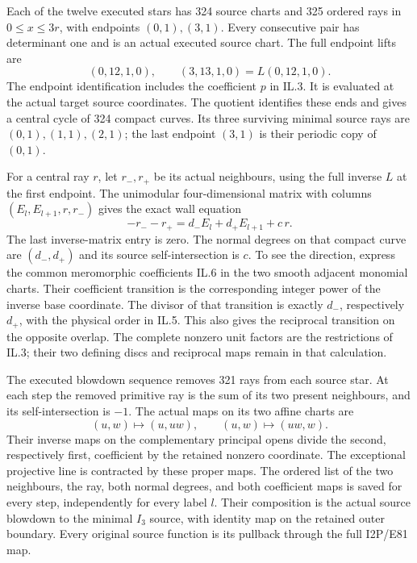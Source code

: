 Each of the twelve executed stars has 324 source charts and 325
ordered rays in \(0\leq x\leq3r\), with endpoints \((0,1),(3,1)\).
Every consecutive pair has determinant one and is an actual
executed source chart. The full endpoint lifts are
\[
       (0,12,1,0),\qquad(3,13,1,0)
                    =L(0,12,1,0).
 \tag{IL.9}
\]
The endpoint identification includes the coefficient \(p\) in
IL.3. It is evaluated at the actual target source coordinates.
The quotient identifies these ends and gives a central cycle of
324 compact curves. Its three surviving minimal source rays are
\((0,1),(1,1),(2,1)\); the last endpoint \((3,1)\) is their
periodic copy of \((0,1)\).

For a central ray \(r\), let \(r_-,r_+\) be its actual neighbours,
using the full inverse \(L\) at the first endpoint. The unimodular
four-dimensional matrix with columns
\((E_l,E_{l+1},r,r_-)\) gives the exact wall equation
\[
 -r_- -r_+=d_-E_l+d_+E_{l+1}+c\,r.
 \tag{IL.10}
\]
The last inverse-matrix entry is zero. The normal degrees on that
compact curve are \((d_-,d_+)\) and its source self-intersection is
\(c\). To see the direction, express the common meromorphic
coefficients IL.6 in the two smooth adjacent monomial charts.
Their coefficient transition is the corresponding integer power
of the inverse base coordinate. The divisor of that transition is
exactly \(d_-\), respectively \(d_+\), with the physical order in
IL.5. This also gives the reciprocal transition on the opposite
overlap. The complete nonzero unit factors are the restrictions of
IL.3; their two defining discs and reciprocal maps remain in that
calculation.

The executed blowdown sequence removes 321 rays from each source
star. At each step the removed primitive ray is the sum of its
two present neighbours, and its self-intersection is \(-1\).
The actual maps on its two affine charts are
\[
       (u,w)\longmapsto(u,uw),\qquad
       (u,w)\longmapsto(uw,w).
 \tag{IL.11}
\]
Their inverse maps on the complementary principal opens divide
the second, respectively first, coefficient by the retained
nonzero coordinate. The exceptional projective line is contracted
by these proper maps. The ordered list of the two neighbours,
the ray, both normal degrees, and both coefficient maps is saved
for every step, independently for every label \(l\).
Their composition is the actual source blowdown to the minimal
\(I_3\) source, with identity map on the retained outer boundary.
Every original source function is its pullback through the full
I2P/E81 map.

